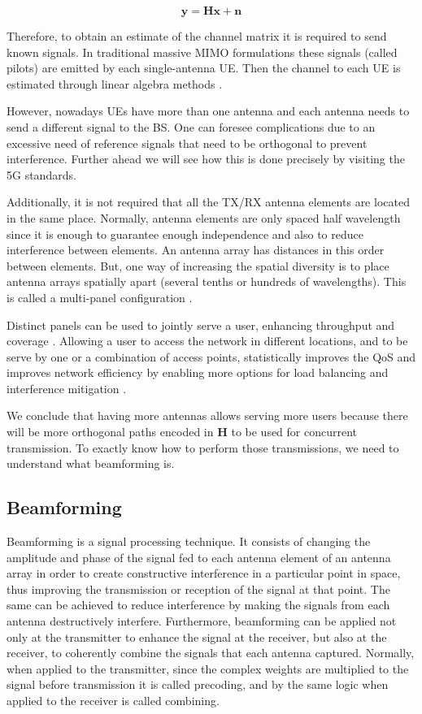 \begin{equation} \label{eq:channel}
    \bm{y} = \bm{H} \bm{x} + \bm{n}
\end{equation}


Therefore, to obtain an estimate of the channel matrix it is required to send known signals. In traditional massive MIMO formulations these signals (called pilots) are emitted by each single-antenna \ac{UE}. Then the channel to each \ac{UE} is estimated through linear algebra methods \cite{fundamentals_of_massive_mimo}.

However, nowadays \acp{UE} have more than one antenna and each antenna needs to send a different signal to the \ac{BS}. One can foresee complications due to an excessive need of reference signals that need to be orthogonal to prevent interference. Further ahead we will see how this is done precisely by visiting the 5G standards. 

Additionally, it is not required that all the \ac{TX}/\ac{RX} antenna elements are located in the same place. Normally, antenna elements are only spaced half wavelength since it is enough to guarantee enough independence and also to reduce interference between elements. An antenna array has distances in this order between elements. But, one way of increasing the spatial diversity is to place antenna arrays spatially apart (several tenths or hundreds of wavelengths). This is called a multi-panel configuration \cite{8316768}. 

Distinct panels can be used to jointly serve a user, enhancing throughput and coverage \cite{6804225}. Allowing a user to access the network in different locations, and to be serve by one or a combination of access points, statistically improves the QoS and improves network efficiency by enabling more options for load balancing and interference mitigation \cite{dmimo_tno}.

We conclude that having more antennas allows serving more users because there will be more orthogonal paths encoded in $\bm{H}$ to be used for concurrent transmission. To exactly know how to perform those transmissions, we need to understand what beamforming is. 

\subsection*{Beamforming}

Beamforming is a signal processing technique. It consists of changing the amplitude and phase of the signal fed to each antenna element of an antenna array in order to create constructive interference in a particular point in space, thus improving the transmission or reception of the signal at that point. The same can be achieved to reduce interference by making the signals from each antenna destructively interfere. Furthermore, beamforming can be applied not only at the transmitter to enhance the signal at the receiver, but also at the receiver, to coherently combine the signals that each antenna captured. Normally, when applied to the transmitter, since the complex weights are multiplied to the signal before transmission it is called precoding, and by the same logic when applied to the receiver is called combining.

